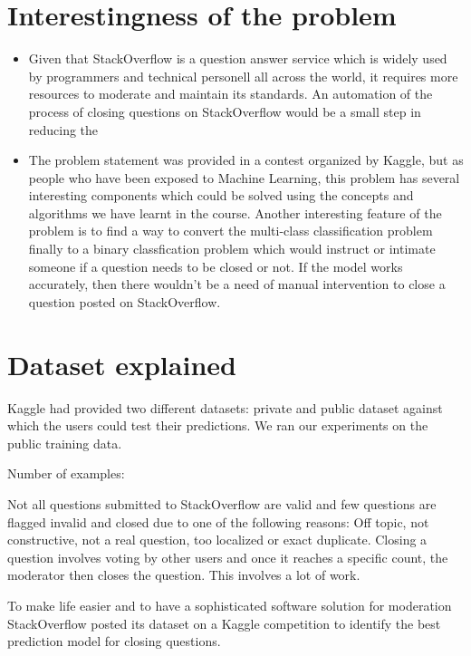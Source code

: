 \documentclass[11pt]{exam}
\begin{document}
\section{Interestingness of the problem}

\begin{itemize}
	\item[] 

Given that StackOverflow is a question answer service which is widely used by programmers and technical personell all across the world, it requires more resources to moderate and maintain its standards. An automation of the process of closing questions on StackOverflow would be a small step in reducing the  

\item[] The problem statement was provided in a contest organized by Kaggle, but as people who have been exposed to Machine Learning, this problem has several interesting components which could be solved using the concepts and algorithms we have learnt in the course. Another interesting feature of the problem is to find a way to convert the multi-class classification problem finally to a binary classfication problem which would instruct or intimate someone if a question needs to be closed or not.
If the model works accurately, then there wouldn't be a need of manual intervention to close a question posted on StackOverflow. 

\end{itemize}


\section{Dataset explained}


Kaggle had provided two different datasets: private and public dataset against which the users could test their predictions. We ran our experiments on the public training data. 

Number of examples:



Not all questions submitted to StackOverflow are valid and few questions are flagged invalid and closed due to one of the following reasons:
Off topic, not constructive, not a real question, too localized or exact duplicate. Closing a question involves voting by other users and once it reaches a specific count, the moderator then closes the question. This involves a lot of work.

To make life easier and to have a sophisticated software solution for moderation StackOverflow posted its dataset on a Kaggle competition to identify the best prediction model for closing questions.
\end{document}
